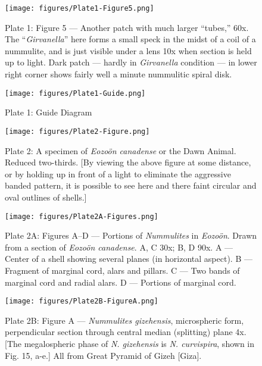 \documentclass[a4paper, 12pt, oneside]{article}
\begin{document}
\clearpage
\begin{figure}[b]
\centering
\texttt{[image: figures/Plate1-Figure5.png]}
\caption{\small Plate 1: Figure 5 --- Another patch with much larger ``tubes,'' 60x. The ``\emph{Girvanella}'' here forms a small speck in the midst of a coil of a nummulite, and is just visible under a lens 10x when section is held up to light. Dark patch --- hardly in \emph{Girvanella} condition --- in lower right corner shows fairly well a minute nummulitic spiral disk.}
\end{figure}
\clearpage
\begin{figure}[b]
\centering
\texttt{[image: figures/Plate1-Guide.png]}
\caption{\small Plate 1: Guide Diagram}
\end{figure}
\clearpage
{}
\cfoot{\thepage}
\begin{figure}[b]
\centering
\texttt{[image: figures/Plate2-Figure.png]}
\caption{\small Plate 2: A specimen of \emph{Eozoön canadense} or the Dawn Animal. Reduced two-thirds. [By viewing the above figure at some distance, or by holding up in front of a light to eliminate the aggressive banded pattern, it is possible to see here and there faint circular and oval outlines of shells.]}
\end{figure}
\clearpage
{}
\cfoot{\thepage}
\begin{figure}[b]
\centering
\texttt{[image: figures/Plate2A-Figures.png]}
\caption{\small Plate 2A: Figures A--D --- Portions of \emph{Nummulites} in \emph{Eozoön}. Drawn from a section of \emph{Eozoön canadense}. A, C 30x; B, D 90x. A --- Center of a shell showing several planes (in horizontal aspect). B --- Fragment of marginal cord, alars and pillars. C --- Two bands of marginal cord and radial alars. D --- Portions of marginal cord.}
\end{figure}
\clearpage
{}
\cfoot{\thepage}
\begin{figure}[b]
\centering
\texttt{[image: figures/Plate2B-FigureA.png]}
\caption{\small Plate 2B: Figure A --- \emph{Nummulites gizehensis}, microspheric form, perpendicular section through central median (splitting) plane 4x. [The megalospheric phase of \emph{N. gizehensis} is \emph{N. curvispira}, shown in Fig. 15, a-e.] All from Great Pyramid of Gizeh [Giza].}
\end{figure}
\end{document}
